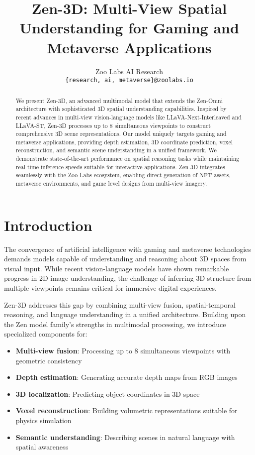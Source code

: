 \documentclass[11pt,a4paper]{article}
\title{\textbf{Zen-3D: Multi-View Spatial Understanding for Gaming and Metaverse Applications}}
\author{
Zoo Labs AI Research\\
\texttt{\{research, ai, metaverse\}@zoolabs.io}\\
}
\date{}
\begin{document}
\maketitle

\begin{abstract}
We present Zen-3D, an advanced multimodal model that extends the Zen-Omni architecture with sophisticated 3D spatial understanding capabilities. Inspired by recent advances in multi-view vision-language models like LLaVA-Next-Interleaved and LLaVA-ST, Zen-3D processes up to 8 simultaneous viewpoints to construct comprehensive 3D scene representations. Our model uniquely targets gaming and metaverse applications, providing depth estimation, 3D coordinate prediction, voxel reconstruction, and semantic scene understanding in a unified framework. We demonstrate state-of-the-art performance on spatial reasoning tasks while maintaining real-time inference speeds suitable for interactive applications. Zen-3D integrates seamlessly with the Zoo Labs ecosystem, enabling direct generation of NFT assets, metaverse environments, and game level designs from multi-view imagery.
\end{abstract}

\section{Introduction}

The convergence of artificial intelligence with gaming and metaverse technologies demands models capable of understanding and reasoning about 3D spaces from visual input. While recent vision-language models have shown remarkable progress in 2D image understanding, the challenge of inferring 3D structure from multiple viewpoints remains critical for immersive digital experiences.

Zen-3D addresses this gap by combining multi-view fusion, spatial-temporal reasoning, and language understanding in a unified architecture. Building upon the Zen model family's strengths in multimodal processing, we introduce specialized components for:

\begin{itemize}
\item \textbf{Multi-view fusion}: Processing up to 8 simultaneous viewpoints with geometric consistency
\item \textbf{Depth estimation}: Generating accurate depth maps from RGB images
\item \textbf{3D localization}: Predicting object coordinates in 3D space
\item \textbf{Voxel reconstruction}: Building volumetric representations suitable for physics simulation
\item \textbf{Semantic understanding}: Describing scenes in natural language with spatial awareness
\end{itemize}
\end{document}
